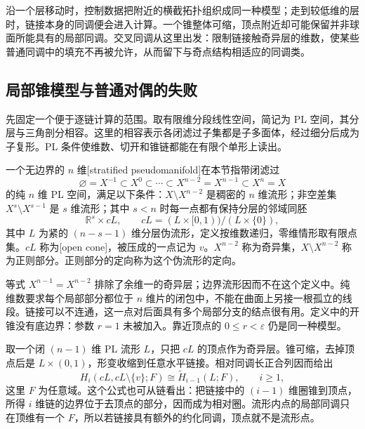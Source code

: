 沿一个层移动时，控制数据把附近的横截拓扑组织成同一种模型；走到较低维的层时，链接本身的同调便会进入计算。一个锥整体可缩，顶点附近却可能保留并非球面所能具有的局部同调。交叉同调从这里出发：限制链接触奇异层的维数，使某些普通同调中的填充不再被允许，从而留下与奇点结构相适应的同调类。

\subsection{局部锥模型与普通对偶的失败}
\label{g2:subsec:B03:01}

先固定一个便于逐链计算的范围。取有限维分段线性空间，简记为 PL 空间，其分层与三角剖分相容。这里的相容表示各闭滤过子集都是子多面体，经过细分后成为子复形。PL 条件使维数、切开和锥链都能在有限个单形上读出。

\begin{definition}\label{g2:def:pl-stratified-pseudomanifold}
	一个无边界的 \(n\) 维[stratified pseudomanifold]在本节指带闭滤过
	\[
		\varnothing=X^{-1}\subset X^0\subset\cdots\subset X^{n-2}=X^{n-1}\subset X^n=X
	\]
	的纯 \(n\) 维 PL 空间，满足以下条件：\(X\setminus X^{n-2}\) 是稠密的 \(n\) 维流形；非空差集 \(X^s\setminus X^{s-1}\) 是 \(s\) 维流形；其中 \(s<n\) 时每一点都有保持分层的邻域同胚
	\[
		\mathbb R^s\times cL,\qquad
		cL=(L\times[0,1))/(L\times\{0\}),
	\]
	其中 \(L\) 为紧的 \((n-s-1)\) 维分层伪流形，定义按维数递归，零维情形取有限点集。\(cL\) 称为[open cone]，被压成的一点记为 \(v\)。\(X^{n-2}\) 称为奇异集，\(X\setminus X^{n-2}\) 称为正则部分。正则部分的定向称为这个伪流形的定向。
\end{definition}

等式 \(X^{n-1}=X^{n-2}\) 排除了余维一的奇异层；边界流形因而不在这个定义中。纯维数要求每个局部部分都位于 \(n\) 维片的闭包中，不能在曲面上另接一根孤立的线段。链接可以不连通，这一点对后面具有多个局部分支的结点很有用。定义中的开锥没有底边界：参数 \(r=1\) 未被加入。靠近顶点的 \(0\le r<\varepsilon\) 仍是同一种模型。

\ProseParagraphBreak

取一个闭 \((n-1)\) 维 PL 流形 \(L\)，只把 \(cL\) 的顶点作为奇异层。锥可缩，去掉顶点后是 \(L\times(0,1)\)，形变收缩到任意水平链接。相对同调长正合列因而给出
\begin{equation}\label{g2:eq:cone-local-homology}
	H_i(cL,cL\setminus\{v\};F)\cong\widetilde H_{i-1}(L;F),\qquad i\ge1,
\end{equation}
这里 \(F\) 为任意域。这个公式也可从链看出：把链接中的 \((i-1)\) 维圈锥到顶点，所得 \(i\) 维链的边界位于去顶点的部分，因而成为相对圈。流形内点的局部同调只在顶维有一个 \(F\)，所以若链接具有额外的约化同调，顶点就不是流形点。

